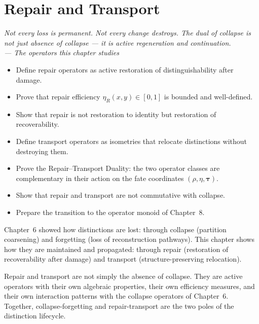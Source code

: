 \documentclass[12pt,twoside,openright]{book}
\newcommand{\survRatio}{\rho}             %
\newcommand{\repEff}{\eta}               %
\newenvironment{epigraph}[2]{%
  \vspace{1em}\begin{flushright}
  \begin{minipage}{0.72\textwidth}
  \itshape\small #1\\[0.4em]
  \upshape\footnotesize\sffamily\color{DistGray}--- #2
  \end{minipage}\end{flushright}\vspace{1.5em}}{}
\newenvironment{objectives}{%
  \begin{tcolorbox}[colback=DistBlue!5,colframe=DistBlue,
    title={\faCheckCircle\enspace Chapter Objectives},
    fonttitle=\sffamily\bfseries\color{white},
    attach boxed title to top left={yshift=-2mm,xshift=4mm},
    boxed title style={colback=DistBlue},breakable]
  \begin{itemize}[leftmargin=*,nosep]}{%
  \end{itemize}\end{tcolorbox}\vspace{1em}}
\providecommand{\repairEff}[1]{\eta_{R}(#1)}
\begin{document}

\chapter{Repair and Transport}
\label{ch:repair-transport}

\begin{epigraph}{Not every loss is permanent. Not every change
  destroys. The dual of collapse is not just absence of collapse
  --- it is active regeneration and continuation.}{The operators
  this chapter studies}
\end{epigraph}

\begin{objectives}
\item Define repair operators as active restoration of
  distinguishability after damage.
\item Prove that repair efficiency $\repairEff{x,y}\in[0,1]$
  is bounded and well-defined.
\item Show that repair is not restoration to identity but
  restoration of recoverability.
\item Define transport operators as isometries that relocate
  distinctions without destroying them.
\item Prove the Repair--Transport Duality: the two operator
  classes are complementary in their action on the fate
  coordinates $(\survRatio, \repEff, \boldsymbol{\tau})$.
\item Show that repair and transport are not commutative with
  collapse.
\item Prepare the transition to the operator monoid of
  Chapter~8.
\end{objectives}

Chapter~6 showed how distinctions are lost: through collapse
(partition coarsening) and forgetting (loss of reconstruction
pathways). This chapter shows how they are maintained and
propagated: through repair (restoration of recoverability
after damage) and transport (structure-preserving relocation).

Repair and transport are not simply the absence of collapse.
They are active operators with their own algebraic properties,
their own efficiency measures, and their own interaction
patterns with the collapse operators of Chapter~6. Together,
collapse-forgetting and repair-transport are the two poles of
the distinction lifecycle.
\end{document}
